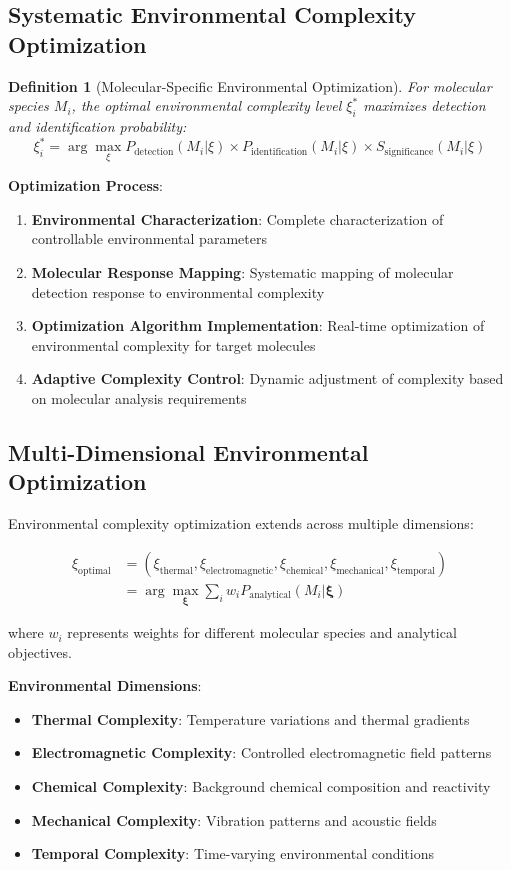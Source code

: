 \documentclass[11pt,a4paper]{article}
\newtheorem{definition}[theorem]{Definition}
\theoremstyle{remark}
\begin{document}
\subsection{Systematic Environmental Complexity Optimization}

\begin{definition}[Molecular-Specific Environmental Optimization]
For molecular species $M_i$, the optimal environmental complexity level $\xi_i^*$ maximizes detection and identification probability:
$$\xi_i^* = \arg\max_\xi P_{\text{detection}}(M_i|\xi) \times P_{\text{identification}}(M_i|\xi) \times S_{\text{significance}}(M_i|\xi)$$
\end{definition}

\textbf{Optimization Process}:
\begin{enumerate}
\item \textbf{Environmental Characterization}: Complete characterization of controllable environmental parameters
\item \textbf{Molecular Response Mapping}: Systematic mapping of molecular detection response to environmental complexity
\item \textbf{Optimization Algorithm Implementation}: Real-time optimization of environmental complexity for target molecules
\item \textbf{Adaptive Complexity Control}: Dynamic adjustment of complexity based on molecular analysis requirements
\end{enumerate}

\subsection{Multi-Dimensional Environmental Optimization}

Environmental complexity optimization extends across multiple dimensions:

\begin{align}
\xi_{\text{optimal}} &= (\xi_{\text{thermal}}, \xi_{\text{electromagnetic}}, \xi_{\text{chemical}}, \xi_{\text{mechanical}}, \xi_{\text{temporal}})\\
&= \arg\max_{\boldsymbol{\xi}} \sum_i w_i P_{\text{analytical}}(M_i|\boldsymbol{\xi})
\end{align}

where $w_i$ represents weights for different molecular species and analytical objectives.

\textbf{Environmental Dimensions}:
\begin{itemize}
\item \textbf{Thermal Complexity}: Temperature variations and thermal gradients
\item \textbf{Electromagnetic Complexity}: Controlled electromagnetic field patterns
\item \textbf{Chemical Complexity}: Background chemical composition and reactivity
\item \textbf{Mechanical Complexity}: Vibration patterns and acoustic fields
\item \textbf{Temporal Complexity}: Time-varying environmental conditions
\end{itemize}
\end{document}
